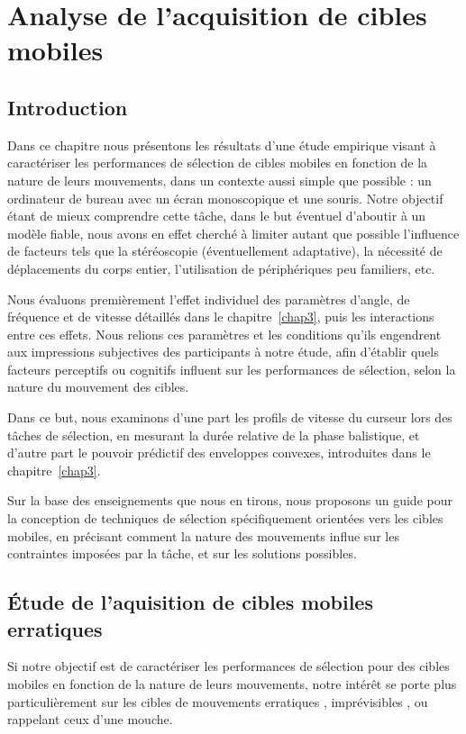 
\chapter[Analyse de l'acquisition de cibles mobiles]{Analyse de l'acquisition de cibles mobiles}
\minitoc
\label{chap4}
\cleardoublepage

\section{Introduction}
	Dans ce chapitre nous présentons les résultats d'une étude empirique visant à caractériser les performances de sélection de cibles mobiles en fonction de la nature de leurs mouvements, dans un contexte aussi simple que possible : un ordinateur de bureau avec un écran monoscopique et une souris. Notre objectif étant de mieux comprendre cette tâche, dans le but éventuel d'aboutir à un modèle fiable, nous avons en effet cherché à limiter autant que possible l'influence de facteurs tels que la stéréoscopie (éventuellement adaptative), la nécessité de déplacements du corps entier, l'utilisation de périphériques peu familiers, etc. 
	
	Nous évaluons premièrement l'effet individuel des paramètres d'angle, de fréquence et de vitesse détaillés dans le chapitre~\ref{chap3}, puis les interactions entre ces effets. Nous relions ces paramètres et les conditions qu'ils engendrent aux impressions subjectives des participants à notre étude, afin d'établir quels facteurs perceptifs ou cognitifs influent sur les performances de sélection, selon la nature du mouvement des cibles.

	Dans ce but, nous examinons d'une part les profils de vitesse du curseur lors des tâches de sélection, en mesurant la durée relative de la phase balistique, et d'autre part le pouvoir prédictif des enveloppes convexes, introduites dans le chapitre~\ref{chap3}.
	
	Sur la base des enseignements que nous en tirons, nous proposons un guide pour la conception de techniques de sélection spécifiquement orientées vers les cibles mobiles, en précisant comment la nature des mouvements influe sur les contraintes imposées par la tâche, et sur les solutions possibles.

\section{Étude de l'aquisition de cibles mobiles erratiques}
	Si notre objectif est de caractériser les performances de sélection pour des cibles mobiles en fonction de la nature de leurs mouvements, notre intérêt se porte plus particulièrement sur les cibles de mouvements \og erratiques \fg{}, \og imprévisibles \fg{}, ou rappelant ceux d'une mouche.
	
